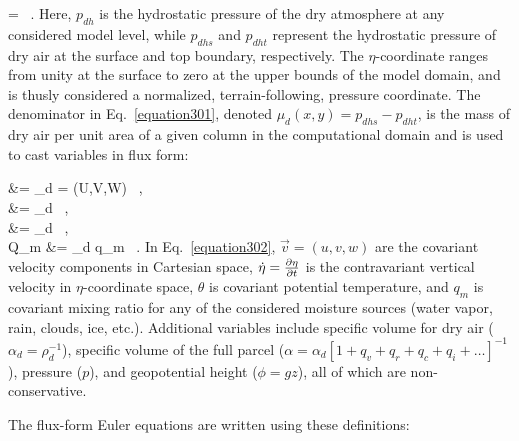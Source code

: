 \be
\eta =  \, .
\label{equation301}
\ee
\noindent
 Here, $p_{dh}$ is the hydrostatic pressure of the dry atmosphere at any considered model level, while $p_{dhs}$ and $p_{dht}$ represent the hydrostatic pressure of dry air at the surface and top boundary, respectively. The $\eta$-coordinate ranges from unity at the surface to zero at the upper bounds of the model domain, and is thusly considered a normalized, terrain-following, pressure coordinate. The denominator in Eq.~\eqref{equation301}, denoted $\mu_d(x,y) = p_{dhs} - p_{dht}$, is the mass of dry air per unit area of a given column in the computational domain and is used to cast variables in flux form:

\bse \label{equation302}
\bal
{} &= \mu_d  = (U,V,W) \, , \label{equation302a} \\
\Omega &= \mu_d \dot{\eta} \, , \label{equation302b} \\
\Theta &= \mu_d \theta \, , \label{equation302c} \\
Q_m &= \mu_d q_m \, . \label{equation302d}
\eal
\ese
\noindent
 In Eq.~\eqref{equation302}, $\vec{v} = (u,v,w)$ are the covariant velocity components in Cartesian space, $\dot{\eta} = \frac{\partial\eta}{\partial t}$ is the contravariant vertical velocity in $\eta$-coordinate space, $\theta$ is covariant potential temperature, and $q_m$ is covariant mixing ratio for any of the considered moisture sources (water vapor, rain, clouds, ice, etc.). Additional variables include specific volume for dry air ($ \alpha_d = \rho_d^{-1}$), specific volume of the full parcel ($\alpha = \alpha_d[1 + q_v + q_r + q_c + q_i + \ldots]^{-1}$), pressure ($p$), and geopotential height ($\phi = gz$), all of which are non-conservative. 

The flux-form Euler equations are written using these definitions:

